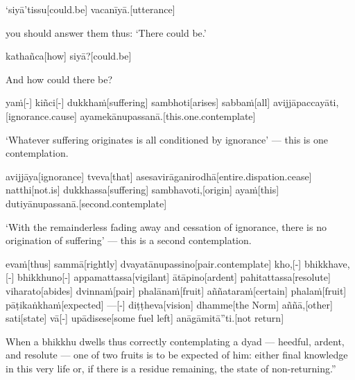 \begin{samepage}
\begingl[glneveryline={\PaliGlossA,\PaliGlossB}]
‘siyā’tissu[could.be] vacanīyā.[utterance]
\endgl
\nopagebreak
\linespread{0.5}
\begin{spacin}{0.2}
{\PaliGlossFT you should answer them thus: ‘There could be.’}
\end{spacin}
\vskip 12pt
\end{samepage}
\begin{samepage}
\begingl[glneveryline={\PaliGlossA,\PaliGlossB}]
kathañca[how] siyā?[could.be]
\endgl
\nopagebreak
\linespread{0.5}
\begin{spacin}{0.2}
{\PaliGlossFT And how could there be?}
\end{spacin}
\vskip 12pt
\end{samepage}
\begin{samepage}
\begingl[glneveryline={\PaliGlossA,\PaliGlossB}]
yaṁ[-] kiñci[-] dukkhaṁ[suffering] sambhoti[arises] sabbaṁ[all] avijjāpaccayāti,[ignorance.cause] ayamekānupassanā.[this.one.contemplate]
\endgl
\nopagebreak
\linespread{0.5}
\begin{spacin}{0.2}
{\PaliGlossFT ‘Whatever suffering originates is all conditioned by ignorance’ — ­this is one contemplation.}
\end{spacin}
\vskip 12pt
\end{samepage}
\begin{samepage}
\begingl[glneveryline={\PaliGlossA,\PaliGlossB}]
avijjāya[ignorance] tveva[that] asesavirāganirodhā[entire.dispation.cease] natthi[not.is] dukkhassa[suffering] sambhavoti,[origin] ayaṁ[this] dutiyānupassanā.[second.contemplate]
\endgl
\nopagebreak
\linespread{0.5}
\begin{spacin}{0.2}
{\PaliGlossFT ‘With the remainderless fading away and cessation of ignorance, there is no origination of suffering’ — this is a second contemplation.}
\end{spacin}
\vskip 12pt
\end{samepage}
\begin{samepage}
\begingl[glneveryline={\PaliGlossA,\PaliGlossB}]
evaṁ[thus] sammā[rightly] dvayatānupassino[pair.contemplate] kho,[-] bhikkhave,[-] bhikkhuno[-] appamattassa[vigilant] ātāpino[ardent] pahitattassa[resolute] viharato[abides] dvinnaṁ[pair] phalānaṁ[fruit] aññataraṁ[certain] phalaṁ[fruit] pāṭikaṅkhaṁ[expected] —[-] diṭṭheva[vision] dhamme[the Norm] aññā,[other] sati[state] vā[-] upādisese[some fuel left] anāgāmitā”ti.[not return]
\endgl
\nopagebreak
\linespread{0.5}
\begin{spacin}{0.2}
{\PaliGlossFT When a bhikkhu dwells thus correctly contemplating a dyad — heedful, ardent, and resolute — one of two fruits is to be expected of him: either final knowledge in this very life or, if there is a residue remaining, the state of non-returning.”}
\end{spacin}
\vskip 12pt
\end{samepage}
